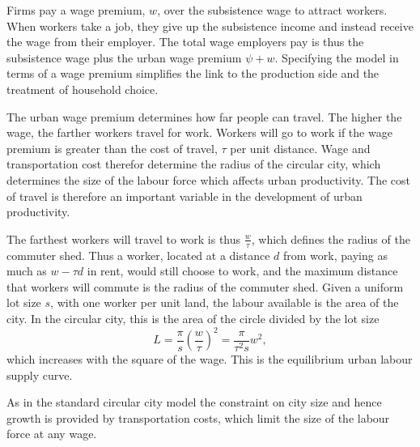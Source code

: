 Firms pay a wage premium, $w$, over the subsistence wage to attract workers. 
When workers take a job, they give up the subsistence income and instead receive the wage from their employer. 
The total wage employers pay is thus the subsistence wage plus the urban wage premium  $\psi + w$.
Specifying the model in terms of a wage premium simplifies the link to the production side and the treatment of household choice.

The urban wage premium determines how far people can travel. The higher the wage, the farther workers travel for work. 
Workers will go to work if the wage premium is greater than the cost of travel, $\tau$ per unit distance. 
Wage and transportation cost therefor determine the radius of the circular city, which determines the size of the labour force which affects urban productivity.  The cost of travel is therefore an important variable in the development of urban productivity. 


The farthest workers will travel to work is thus $\frac{w}{\tau}$, which defines the radius of the commuter shed. Thus a worker, located at a distance $d$ from work, paying as much as $w-\tau d$ in rent, would still choose to work, and the maximum distance that workers will commute is the radius of the commuter shed. Given a uniform lot size $s$, with one worker per unit land, the labour available is the area of the city. In the circular city, this is the area of the circle divided by the lot size
\begin{equation}
                 L%
			=\frac{\pi}{s}  \left(\frac{w}{\tau}\right)^2
			=\frac{\pi}{\tau^2 s} w^2, \label{Eqn:LabourSupply2}
\end{equation}
which increases with the square of the wage. This is the equilibrium urban labour supply curve.

As in the standard circular city model the constraint on city size and hence growth is provided by transportation costs, which limit the size of the labour force at any wage. 

